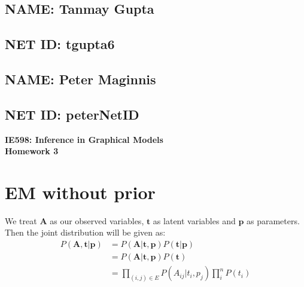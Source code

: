 \documentclass[12pt,onecolumn,letterpaper]{article}
\begin{document}
\begin{minipage}{0.5\textwidth}
\begin{flushleft}
    \subsection*{NAME: Tanmay Gupta}
\end{flushleft}
\end{minipage}
\hfill
\begin{minipage}{0.5\textwidth}
\begin{flushright}
    \subsection*{NET ID: tgupta6}
\end{flushright}
\end{minipage}

\begin{minipage}{0.5\textwidth}
\begin{flushleft}
    \subsection*{NAME: Peter Maginnis}
\end{flushleft}
\end{minipage}
\hfill
\begin{minipage}{0.5\textwidth}
\begin{flushright}
    \subsection*{NET ID: peterNetID}
\end{flushright}
\end{minipage}\begin{center}
    \Large\textbf{IE598: Inference in Graphical Models}\\
    \textbf{Homework 3}
\end{center}

\section*{EM without prior}
We treat $\textbf{A}$ as our observed variables, $\textbf{t}$ as latent variables and $\textbf{p}$ as parameters. Then the joint distribution will be given as:
\begin{align*}
P(\textbf{A},\textbf{t}|\textbf{p}) &= P(\textbf{A}|\textbf{t},\textbf{p})P(\textbf{t}|\textbf{p}) \\
&= P(\textbf{A}|\textbf{t},\textbf{p})P(\textbf{t}) \tag{Since true labels are independent of worker abilities} \\
&=\prod_{(i,j)\in E}P(A_{ij}|t_i,p_j)\prod_{i}^{n}P(t_i) \\
\end{align*}
\end{document}
